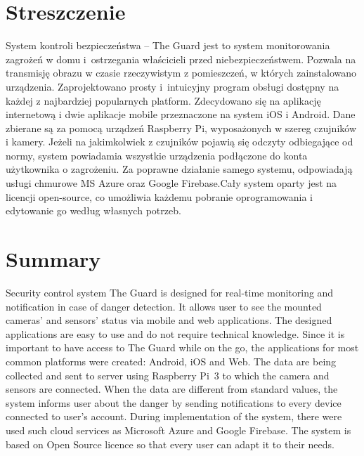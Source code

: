 \chapter*{Streszczenie}
System kontroli bezpieczeństwa – The Guard jest to system monitorowania zagrożeń w domu i~ostrzegania właścicieli przed niebezpieczeństwem. Pozwala na transmisję obrazu w czasie rzeczywistym z pomieszczeń, w których zainstalowano urządzenia. 
Zaprojektowano prosty i~intuicyjny program obsługi dostępny na każdej z najbardziej popularnych platform. Zdecydowano się na aplikację internetową i dwie aplikacje mobile przeznaczone na system iOS i Android. Dane zbierane są za pomocą urządzeń Raspberry Pi, wyposażonych w szereg czujników i kamery. Jeżeli na jakimkolwiek z czujników pojawią się odczyty odbiegające od normy, system powiadamia wszystkie urządzenia podłączone do konta użytkownika o zagrożeniu. Za poprawne działanie samego systemu, odpowiadają usługi chmurowe MS Azure oraz Google Firebase.Cały system oparty jest na licencji open-source, co umożliwia każdemu pobranie oprogramowania i edytowanie go według własnych potrzeb.

{\let\clearpage\relax\chapter*{Summary}}


Security control system The Guard is designed for real-time monitoring and notification in case of danger detection. It allows user to see the mounted cameras' and sensors' status via mobile and web applications. 
The designed applications are easy to use and do not require technical knowledge. Since it is important to have access to The Guard while on the go, the applications for most common platforms were created: Android, iOS and Web. The data are being collected and sent to server using Raspberry Pi~3 to which the camera and sensors are connected. When the data are different from standard values, the system informs user about the danger by sending notifications to every device connected to user's account. During implementation of the system, there were used such cloud services as Microsoft Azure and Google Firebase. The system is based on Open Source licence so that every user can adapt it to their needs.


